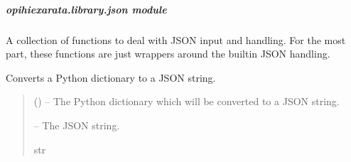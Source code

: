 \documentclass[letterpaper,11pt,english]{sphinxmanual}
\begin{document}
\sphinxstepscope


\subparagraph{opihiexarata.library.json module}
\label{\detokenize{code/opihiexarata.library.json:module-opihiexarata.library.json}}\label{\detokenize{code/opihiexarata.library.json:opihiexarata-library-json-module}}\label{\detokenize{code/opihiexarata.library.json::doc}}
\sphinxAtStartPar
A collection of functions to deal with JSON input and handling. For the
most part, these functions are just wrappers around the built\sphinxhyphen{}in JSON handling.

\begin{savenotes}\begin{fulllineitems}
\label{\detokenize{code/opihiexarata.library.json:opihiexarata.library.json.dictionary_to_json}}
\pysigstartsignatures
{}
\pysigstopsignatures
\sphinxAtStartPar
Converts a Python dictionary to a JSON string.
\begin{quote}\begin{description}
\sphinxAtStartPar
{} () – The Python dictionary which will be converted to a JSON string.

\sphinxAtStartPar
{} – The JSON string.

\sphinxAtStartPar
str

\end{description}\end{quote}

\end{fulllineitems}\end{savenotes}

\end{document}
